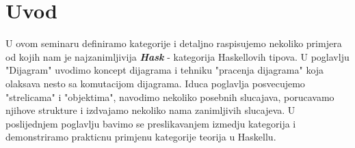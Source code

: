 \documentclass[11pt]{article}
\newcommand{\category}[1]{\textbf{\emph{#1}}}
\theoremstyle{definition}
\begin{document}
  \section{Uvod}
  U ovom seminaru definiramo kategorije i detaljno raspisujemo nekoliko
  primjera od kojih nam je najzanimljivija \category{Hask} - kategorija
  Haskellovih tipova.
  U poglavlju "Dijagram" uvodimo koncept dijagrama i tehniku "pracenja
  dijagrama" koja olaksava nesto sa komutacijom dijagrama.
  Iduca poglavlja posvecujemo  "strelicama" i "objektima", navodimo nekoliko
  posebnih slucajava, porucavamo njihove strukture i izdvajamo nekoliko nama
  zanimljivih slucajeva.
  U poslijednjem poglavlju bavimo se preslikavanjem izmedju kategorija i
  demonstriramo prakticnu primjenu kategorije teorija u Haskellu.
  \newpage
\end{document}
